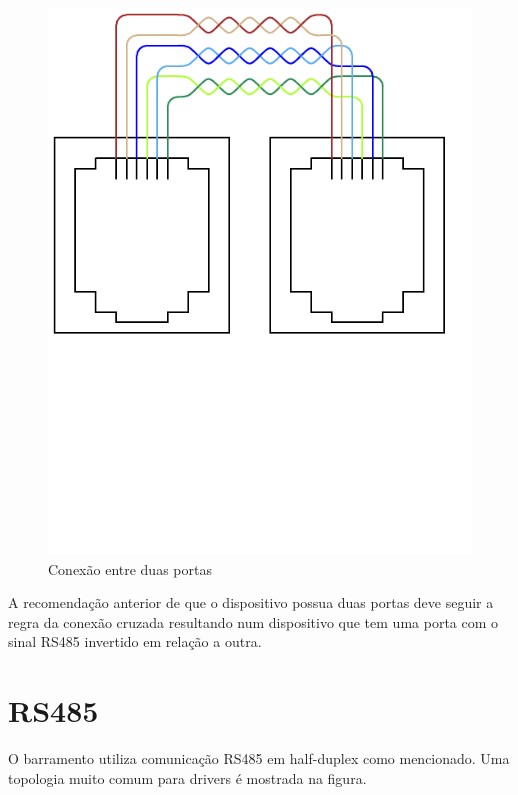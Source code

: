\begin{figure}[H]
\centering
\includegraphics{../media/hbusinterconn.pdf}
\caption{Conexão entre duas portas}
\end{figure}

A recomendação anterior de que o dispositivo possua duas portas deve seguir a regra da conexão cruzada resultando num dispositivo que tem uma porta com o sinal RS485 invertido em relação a outra.

\section{RS485}

O barramento utiliza comunicação RS485 em half-duplex como mencionado. Uma topologia muito comum para drivers é mostrada na figura.

